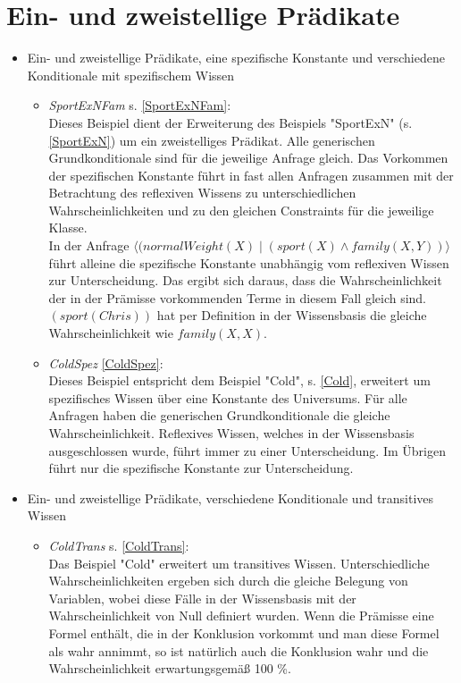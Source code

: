 \documentclass[a4paper, 11pt]{book}
\begin{document}
\section{Ein- und zweistellige Prädikate}
\begin{itemize}
\item{Ein- und zweistellige Prädikate, eine spezifische Konstante und verschiedene Konditionale mit spezifischem Wissen}
\begin{itemize}
	\item \textsl{SportExNFam} \label{BSportExNFam} s. \ref{SportExNFam}:\\
	Dieses Beispiel dient der Erweiterung des Beispiels "{}SportExN"{} (s. \ref{SportExN}) um ein zweistelliges Prädikat. Alle generischen Grundkonditionale sind für die jeweilige Anfrage gleich. Das Vorkommen der spezifischen Konstante führt in fast allen Anfragen zusammen mit der Betrachtung des reflexiven Wissens zu unterschiedlichen Wahrscheinlichkeiten und zu den gleichen Constraints für die jeweilige Klasse.\\
	In der Anfrage $\langle (normalWeight(X) \mid (sport(X) \land family(X,Y)) \rangle$\\ führt alleine die spezifische Konstante unabhängig vom reflexiven Wissen zur Unterscheidung. Das ergibt sich daraus, dass die Wahrscheinlichkeit der in der Prämisse vorkommenden Terme in diesem Fall gleich sind. $(sport(Chris)) $ hat per Definition in der Wissensbasis die gleiche Wahrscheinlichkeit wie $family(X,X)$.
	\item \textsl{ColdSpez} \label{BColdSpez} \ref{ColdSpez}:\\
Dieses Beispiel entspricht dem Beispiel "{}Cold"{}, s. \ref{Cold}, erweitert um spezifisches Wissen über eine Konstante des Universums. Für alle Anfragen haben die generischen Grundkonditionale die gleiche Wahrscheinlichkeit. Reflexives Wissen, welches in der Wissensbasis ausgeschlossen wurde, führt immer zu einer Unterscheidung. Im Übrigen führt nur die spezifische Konstante zur Unterscheidung.
\end{itemize}


\item{Ein- und zweistellige Prädikate, verschiedene Konditionale und transitives Wissen}
\begin{itemize}
	\item \textsl{ColdTrans} \label{BColdTrans} s. \ref{ColdTrans}:\\
Das Beispiel "{}Cold"{} erweitert um transitives Wissen. Unterschiedliche Wahrscheinlichkeiten ergeben sich durch die gleiche Belegung von Variablen, wobei diese Fälle in der Wissensbasis mit der Wahrscheinlichkeit von Null definiert wurden. Wenn die Prämisse eine Formel enthält, die in der Konklusion vorkommt und man diese Formel als wahr annimmt, so ist natürlich auch die Konklusion wahr und die Wahrscheinlichkeit erwartungsgemäß 100 \%.


\end{itemize}
\end{itemize}
\end{document}
